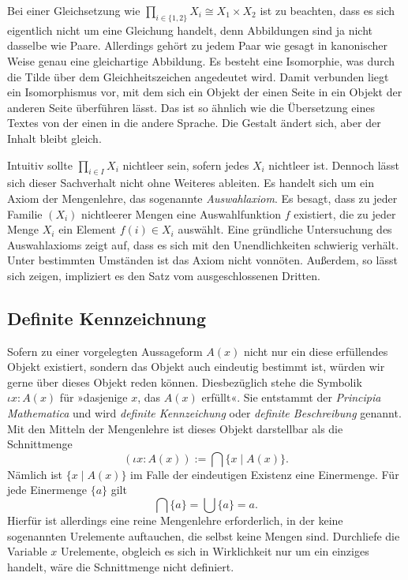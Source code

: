 Bei einer Gleichsetzung wie $\prod_{i\in\{1,2\}} X_i\cong X_1\times X_2$ ist
zu beachten, dass es sich eigentlich nicht um eine Gleichung handelt, denn
Abbildungen sind ja nicht dasselbe wie Paare. Allerdings gehört zu jedem
Paar wie gesagt in kanonischer Weise genau eine gleichartige Abbildung.
Es besteht eine Isomorphie, was durch die Tilde über dem Gleichheitszeichen
angedeutet wird. Damit verbunden liegt ein Isomorphismus vor, mit dem
sich ein Objekt der einen Seite in ein Objekt der anderen Seite
überführen lässt. Das ist so ähnlich wie die Übersetzung eines Textes
von der einen in die andere Sprache. Die Gestalt ändert sich, aber der
Inhalt bleibt gleich.

Intuitiv sollte $\prod_{i\in I} X_i$ nichtleer sein, sofern jedes $X_i$
nichtleer ist. Dennoch lässt sich dieser Sachverhalt nicht ohne Weiteres
ableiten. Es handelt sich um ein Axiom der Mengenlehre, das sogenannte
\emph{Auswahlaxiom}. Es besagt, dass zu jeder
Familie $(X_i)$ nichtleerer Mengen eine Auswahlfunktion $f$ existiert,
die zu jeder Menge $X_i$ ein Element $f(i)\in X_i$ auswählt.
Eine gründliche Untersuchung des Auswahlaxioms zeigt auf, dass es sich
mit den Unendlichkeiten schwierig verhält. Unter bestimmten Umständen
ist das Axiom nicht vonnöten. Außerdem, so lässt sich zeigen, impliziert
es den Satz vom ausgeschlossenen Dritten.

\subsection{Definite Kennzeichnung}

Sofern zu einer vorgelegten Aussageform $A(x)$ nicht nur ein diese
erfüllendes Objekt existiert, sondern das Objekt auch eindeutig
bestimmt ist, würden wir gerne über dieses Objekt reden können.
Diesbezüglich stehe die Symbolik $\iota x\colon A(x)$ für
»dasjenige $x$, das $A(x)$ erfüllt«. Sie entstammt der
\emph{Principia Mathematica} und wird \emph{definite Kennzeichung}
oder \emph{definite Beschreibung} genannt. Mit den Mitteln der
Mengenlehre ist dieses Objekt darstellbar als die Schnittmenge
\[(\iota x\colon A(x)) := {\textstyle\bigcap}\{x\mid A(x)\}.\]
Nämlich ist $\{x\mid A(x)\}$ im Falle der eindeutigen Existenz eine
Einermenge. Für jede Einermenge $\{a\}$ gilt
\[\textstyle\bigcap\{a\} = \bigcup\{a\} = a.\]
Hierfür ist allerdings eine reine Mengenlehre erforderlich, in der
keine sogenannten Urelemente auftauchen, die selbst keine Mengen sind.
Durchliefe die Variable $x$ Urelemente, obgleich es sich in Wirklichkeit
nur um ein einziges handelt, wäre die Schnittmenge nicht definiert.

